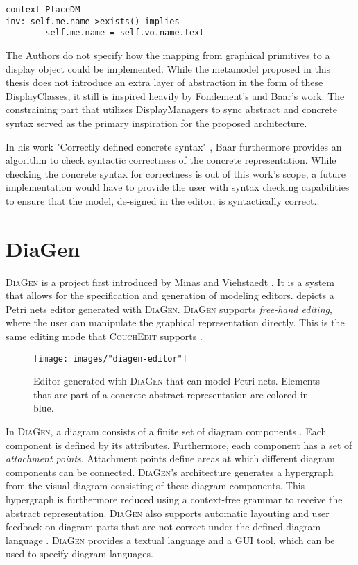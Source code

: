 \begin{lstlisting}[language=OCL,captionpos=b,caption={OCL Invariant that syncs the name attribute of place DisplayClasses and place model elements.},label={lst:ocl-inv}]
context PlaceDM
inv: self.me.name->exists() implies
        self.me.name = self.vo.name.text
\end{lstlisting}

The Authors do not specify how the mapping from graphical primitives to a display object could be implemented. While the metamodel proposed in this thesis does not introduce an extra layer of abstraction in the form of these DisplayClasses, it still is inspired heavily by Fondement's and Baar's work. The constraining part that utilizes DisplayManagers to sync abstract and concrete syntax served as the primary inspiration for the proposed architecture.

In his work "Correctly defined concrete syntax" \cite{baar_correctly_2008}, Baar furthermore provides an algorithm to check syntactic correctness of the concrete representation. While checking the concrete syntax for correctness is out of this work's scope, a future implementation would have to provide the user with syntax checking capabilities to ensure that the model, de-signed in the editor, is syntactically correct..


\section{DiaGen}
\label{sec:diagen}
\textsc{DiaGen} is a project first introduced by Minas and Viehstaedt \cite{minas_diagen_1995}. It is a system that allows for the specification and generation of modeling editors.  depicts a Petri nets editor generated with \textsc{DiaGen}. \textsc{DiaGen} supports \emph{free-hand editing}, where the user can manipulate the graphical representation directly. This is the same editing mode that \textsc{CouchEdit} supports \cite{nachreiner_couchedit_2020}.

\begin{figure}[b]
  \centering
  \texttt{[image: images/"diagen-editor"]}
  \caption{Editor generated with \textsc{DiaGen} that can model Petri nets. Elements that are part of a concrete abstract representation are colored in blue.}
  \label{fig:diagen-editor}
  \end{figure}

In \textsc{DiaGen}, a diagram consists of a finite set of diagram components \cite{minas_concepts_2002}. Each component is defined by its attributes. Furthermore, each component has a set of \emph{attachment points}. Attachment points define areas at which different diagram components can be connected. \textsc{DiaGen}'s architecture generates a hypergraph from the visual diagram consisting of these diagram components. This hypergraph is furthermore reduced using a context-free grammar to receive the abstract representation. \textsc{DiaGen} also supports automatic layouting and user feedback on diagram parts that are not correct under the defined diagram language \cite{minas_concepts_2002}. \textsc{DiaGen} provides a textual language and a GUI tool, which can be used to specify diagram languages. 

